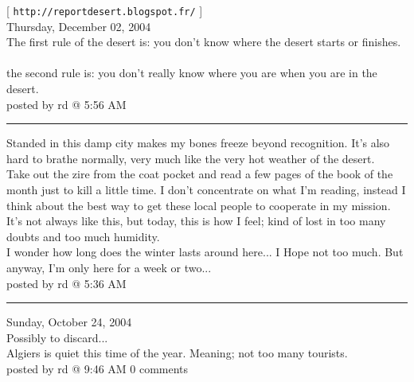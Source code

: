 \documentclass[11pt,twoside,a4paper]{book}
\begin{document}
\begin{multicols*}{2}

[ \texttt{http://reportdesert.blogspot.fr/} ] ~\\

Thursday, December 02, 2004 ~\\

The first rule of the desert is: you don't know where the desert starts or finishes. ~\\

the second rule is: you don't really know where you are when you are in the desert. ~\\

posted by rd @ 5:56 AM %

\begin{center} \rule{0.45\textwidth}{0.001cm} \end{center}

Standed in this damp city makes my bones freeze beyond recognition. It's also hard to brathe normally, very much like the very hot weather of the desert. ~\\

Take out the zire from the coat pocket and read a few pages of the book of the month just to kill a little time. I don't concentrate on what I'm reading, instead I think about the best way to get these local people to cooperate in my mission. It's not always like this, but today, this is how I feel; kind of lost in too many doubts and too much humidity. ~\\

I wonder how long does the winter lasts around here... I Hope not too much. But anyway, I'm only here for a week or two... ~\\

posted by rd @ 5:36 AM %

\begin{center} \rule{0.45\textwidth}{0.001cm} \end{center}

Sunday, October 24, 2004 ~\\
{\large Possibly to discard...} ~\\

Algiers is quiet this time of the year. Meaning; not too many tourists. ~\\

posted by rd @ 9:46 AM   0 comments %


\end{multicols*}
\end{document}
